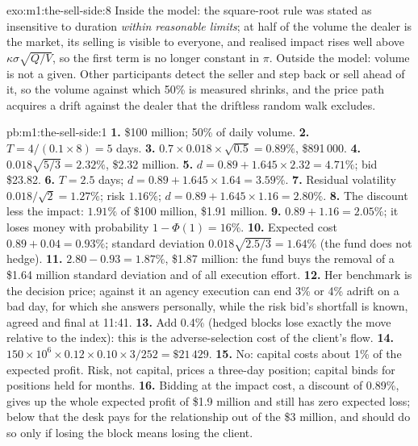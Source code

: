 \begin{solution}{exo:m1:the-sell-side:8}
Inside the model: the square-root rule was stated as insensitive to duration
\emph{within reasonable limits}; at half of the volume the dealer is the
market, its selling is visible to everyone, and realised impact rises well
above $\kappa\sigma\sqrt{Q/V}$, so the first term is no longer constant in
$\pi$. Outside the model: volume is not a given. Other participants detect
the seller and step back or sell ahead of it, so the volume against which
50\% is measured shrinks, and the price path acquires a drift against the
dealer that the driftless random walk excludes.
\end{solution}

\begin{solution}{pb:m1:the-sell-side:1}
\textbf{1.} \$100 million; 50\% of daily volume.
\textbf{2.} $T = 4/(0.1\times 8) = 5$ days.
\textbf{3.} $0.7\times 0.018\times\sqrt{0.5} = 0.89\%$, \$891\,000.
\textbf{4.} $0.018\sqrt{5/3} = 2.32\%$, \$2.32 million.
\textbf{5.} $d = 0.89 + 1.645\times 2.32 = 4.71\%$; bid \$23.82.
\textbf{6.} $T = 2.5$ days; $d = 0.89 + 1.645 \times 1.64 = 3.59\%$.
\textbf{7.} Residual volatility $0.018/\sqrt2 = 1.27\%$; risk $1.16\%$;
$d = 0.89 + 1.645\times 1.16 = 2.80\%$.
\textbf{8.} The discount less the impact: $1.91\%$ of \$100 million,
\$1.91 million.
\textbf{9.} $0.89 + 1.16 = 2.05\%$; it loses money with probability
$1-\Phi(1) = 16\%$.
\textbf{10.} Expected cost $0.89 + 0.04 = 0.93\%$; standard deviation
$0.018\sqrt{2.5/3} = 1.64\%$ (the fund does not hedge).
\textbf{11.} $2.80 - 0.93 = 1.87\%$, \$1.87 million: the fund buys the
removal of a \$1.64 million standard deviation and of all execution effort.
\textbf{12.} Her benchmark is the decision price; against it an agency
execution can end 3\% or 4\% adrift on a bad day, for which she answers
personally, while the risk bid's shortfall is known, agreed and final at
11:41.
\textbf{13.} Add 0.4\% (hedged blocks lose exactly the move relative to the
index): this is the adverse-selection cost of the client's flow.
\textbf{14.} $150\times10^6 \times 0.12 \times 0.10 \times 3/252 = \$21\,429$.
\textbf{15.} No: capital costs about 1\% of the expected profit. Risk, not
capital, prices a three-day position; capital binds for positions held for
months.
\textbf{16.} Bidding at the impact cost, a discount of 0.89\%, gives up the
whole expected profit of \$1.9 million and still has zero expected loss;
below that the desk pays for the relationship out of the \$3 million, and
should do so only if losing the block means losing the client.

\end{solution}
